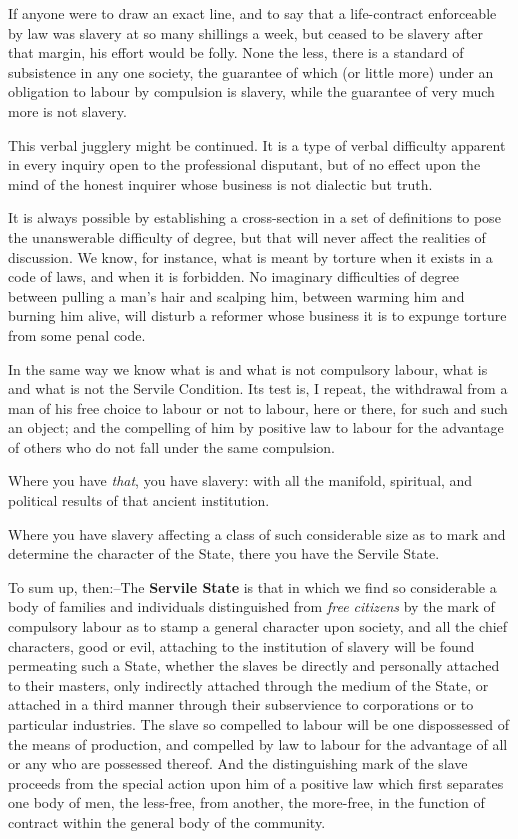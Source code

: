 \documentclass{book}
\begin{document}
If anyone were to draw an exact line, and to say that a life-contract enforceable by law was slavery at so many shillings a week, but ceased to be slavery after that margin, his effort would be folly. None the less, there is a standard of subsistence in any one society, the guarantee of which (or little more) under an obligation to labour by compulsion is slavery, while the guarantee of very much more is not slavery.

This verbal jugglery might be continued. It is a type of verbal difficulty apparent in every inquiry open to the professional disputant, but of no effect upon the mind of the honest inquirer whose business is not dialectic but truth.

It is always possible by establishing a cross-section in a set of definitions to pose the unanswerable difficulty of degree, but that will never affect the realities of discussion. We know, for instance, what is meant by torture when it exists in a code of laws, and when it is forbidden. No imaginary difficulties of degree between pulling a man’s hair and scalping him, between warming him and burning him alive, will disturb a reformer whose business it is to expunge torture from some penal code.

In the same way we know what is and what is not compulsory labour, what is and what is not the Servile Condition. Its test is, I repeat, the withdrawal from a man of his free choice to labour or not to labour, here or there, for such and such an object; and the compelling of him by positive law to labour for the advantage of others who do not fall under the same compulsion.

Where you have \emph{that}, you have slavery: with all the manifold, spiritual, and political results of that ancient institution.

Where you have slavery affecting a class of such considerable size as to mark and determine the character of the State, there you have the Servile State.

To sum up, then:–The \textbf{Servile State} is that in which we find so considerable a body of families and individuals distinguished from \emph{free citizens} by the mark of compulsory labour as to stamp a general character upon society, and all the chief characters, good or evil, attaching to the institution of slavery will be found permeating such a State, whether the slaves be directly and personally attached to their masters, only indirectly attached through the medium of the State, or attached in a third manner through their subservience to corporations or to particular industries. The slave so compelled to labour will be one dispossessed of the means of production, and compelled by law to labour for the advantage of all or any who are possessed thereof. And the distinguishing mark of the slave proceeds from the special action upon him of a positive law which first separates one body of men, the less-free, from another, the more-free, in the function of contract within the general body of the community.
\end{document}
